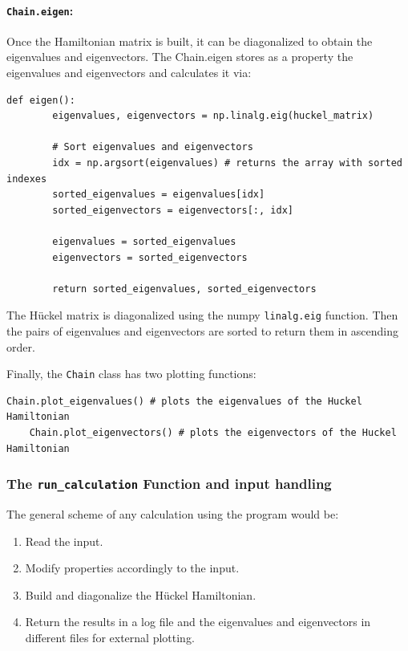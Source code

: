 \documentclass[twocolumn]{article}
\begin{document}
\paragraph{\texttt{Chain.eigen}:} Once the Hamiltonian matrix is built, it can be diagonalized to obtain the eigenvalues and eigenvectors. The Chain.eigen stores as a property the eigenvalues and eigenvectors and calculates it via: 
\begin{lstlisting}[backgroundcolor=\color{LightGray}]
    def eigen():
        eigenvalues, eigenvectors = np.linalg.eig(huckel_matrix)
        
        # Sort eigenvalues and eigenvectors
        idx = np.argsort(eigenvalues) # returns the array with sorted indexes
        sorted_eigenvalues = eigenvalues[idx]
        sorted_eigenvectors = eigenvectors[:, idx]

        eigenvalues = sorted_eigenvalues
        eigenvectors = sorted_eigenvectors

        return sorted_eigenvalues, sorted_eigenvectors
\end{lstlisting} 
The Hückel matrix is diagonalized using the numpy \texttt{linalg.eig} function. Then the pairs of eigenvalues and eigenvectors are sorted to return them in ascending order. 

Finally, the \texttt{Chain} class has two plotting functions:
\begin{lstlisting}[backgroundcolor=\color{LightGray}]
    Chain.plot_eigenvalues() # plots the eigenvalues of the Huckel Hamiltonian
    Chain.plot_eigenvectors() # plots the eigenvectors of the Huckel Hamiltonian
\end{lstlisting} 

\subsubsection{The \texttt{run\_calculation} Function and input handling}
The general scheme of any calculation using the program would be:
\begin{enumerate}
    \item Read the input.
    \item Modify properties accordingly to the input.
    \item Build and diagonalize the Hückel Hamiltonian.
    \item Return the results in a log file and the eigenvalues and eigenvectors in different files for external plotting.
\end{enumerate}
\end{document}
